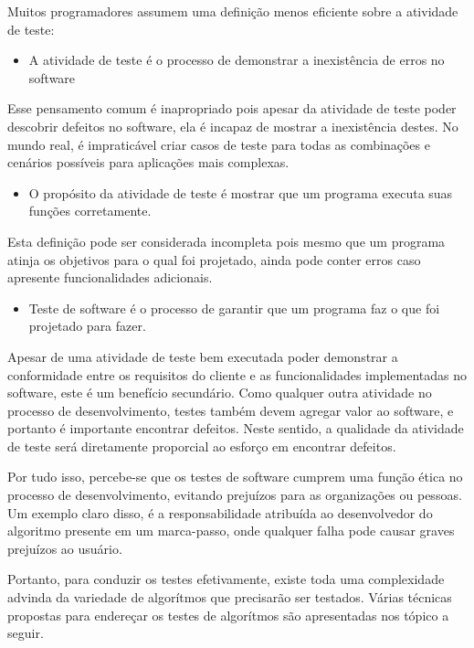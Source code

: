 Muitos programadores assumem uma definição menos eficiente sobre a atividade de teste:

\begin{itemize}
\item A atividade de teste é o processo de demonstrar a inexistência de erros no software
\end{itemize}

Esse pensamento comum é inapropriado pois apesar da atividade de teste poder descobrir defeitos no software, ela é incapaz de mostrar a inexistência destes. No mundo real, é impraticável criar casos de teste para todas as combinações e cenários possíveis para aplicações mais complexas.

\begin{itemize}
\item O propósito da atividade de teste é mostrar que um programa executa suas funções corretamente.
\end{itemize}

Esta definição pode ser considerada incompleta pois mesmo que um programa atinja os objetivos para o qual foi projetado, ainda pode conter erros caso apresente funcionalidades adicionais.

\begin{itemize}
\item Teste de software é o processo de garantir que um programa faz o que foi projetado para fazer.
\end{itemize}

Apesar de uma atividade de teste bem executada poder demonstrar a conformidade entre os requisitos do cliente e as funcionalidades implementadas no software, este é um benefício secundário. Como qualquer outra atividade no processo de desenvolvimento, testes também devem agregar valor ao software, e portanto é importante encontrar defeitos. Neste sentido, a qualidade da atividade de teste será diretamente proporcial ao esforço em encontrar defeitos.

Por tudo isso, percebe-se que os testes de software cumprem uma função ética no processo de desenvolvimento, evitando prejuízos para as organizações ou pessoas. Um exemplo claro disso, é a responsabilidade atribuída ao desenvolvedor do algoritmo presente em um marca-passo, onde qualquer falha pode causar graves prejuízos ao usuário.

Portanto, para conduzir os testes efetivamente, existe toda uma complexidade advinda da variedade de algorítmos que precisarão ser testados. Várias técnicas propostas para endereçar os testes de algorítmos são apresentadas nos tópico a seguir.


